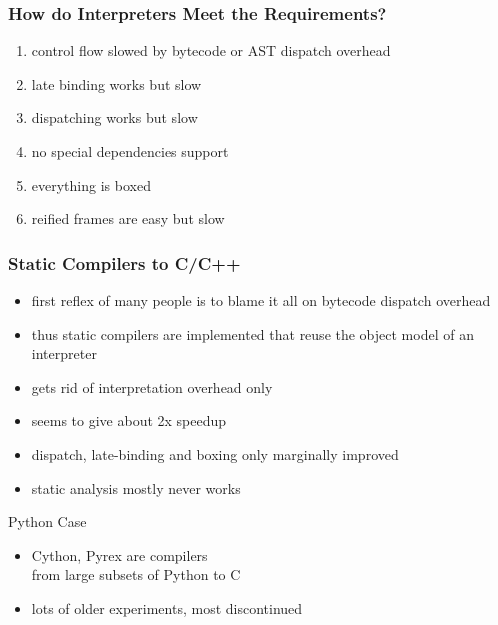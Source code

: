 \documentclass[utf8x]{beamer}
\begin{document}
\begin{frame}
  \frametitle{How do Interpreters Meet the Requirements?}
  \begin{enumerate}
      \item \alert{control flow slowed by bytecode or AST dispatch overhead}
      \item \alert{late binding works but slow}
      \item \alert{dispatching works but slow}
      \item \alert{no special dependencies support}
      \item \alert{everything is boxed}
      \item \alert{reified frames are easy but slow}
  \end{enumerate}
\end{frame}



\begin{frame}
  \frametitle{Static Compilers to C/C++}
  \begin{itemize}
      \item first reflex of many people is to blame it all on bytecode dispatch overhead
      \item thus static compilers are implemented that reuse the object model of an interpreter
      \item gets rid of interpretation overhead only
      \item seems to give about 2x speedup
      \pause
      \item dispatch, late-binding and boxing only marginally improved
      \item static analysis mostly never works
  \end{itemize}
  \pause
  \begin{block}{Python Case}
    \begin{itemize}
    \item \alert{Cython}, \alert{Pyrex} are compilers\\
    from large subsets of Python to C
    \item lots of older experiments, most discontinued
    \end{itemize}
  \end{block}
\end{frame}
\end{document}
